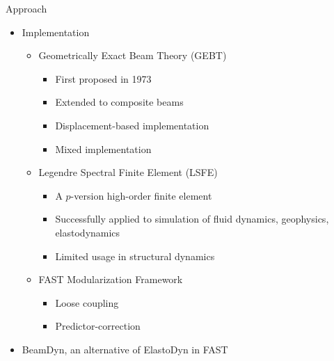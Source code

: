 \documentclass[xcolor=cmyk]{beamer}
\begin{document}
\begin{frame}{Approach}
  \begin{itemize}
    \item
    Implementation
    \begin{itemize}
      \item
      Geometrically Exact Beam Theory (GEBT) 
      \begin{itemize}
        \item
        \pause
        First proposed in 1973 \citep{Ressiner1973}
        \item
        \pause
        Extended to composite beams \citep{HodgesBeamBook}
        \item
        \pause
        Displacement-based implementation \citep{Bottasso:1998,Dymore:2013}
        \item
        \pause
        Mixed implementation \citep{YuGEBT,Wang:GEBT2013}
      \end{itemize}
      \item
      Legendre Spectral Finite Element (LSFE) \citep{Patera:1984}
      \begin{itemize}
          \item
          \pause
          A $p$-version high-order finite element 
          \item
          \pause
          Successfully applied to simulation of fluid dynamics, geophysics, elastodynamics
          \item
          \pause
          Limited usage in structural dynamics
      \end{itemize}
      \item
      FAST Modularization Framework \citep{Jonkman:2013}
      \begin{itemize}
          \item Loose coupling
          \item Predictor-correction          
      \end{itemize}
    \end{itemize}
    \item
    BeamDyn, an alternative of ElastoDyn in FAST
  \end{itemize}
\end{frame}
\end{document}
